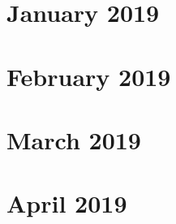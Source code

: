 \chapter{January 2019}












\chapter{February 2019}





\chapter{March 2019}



\chapter{April 2019}



